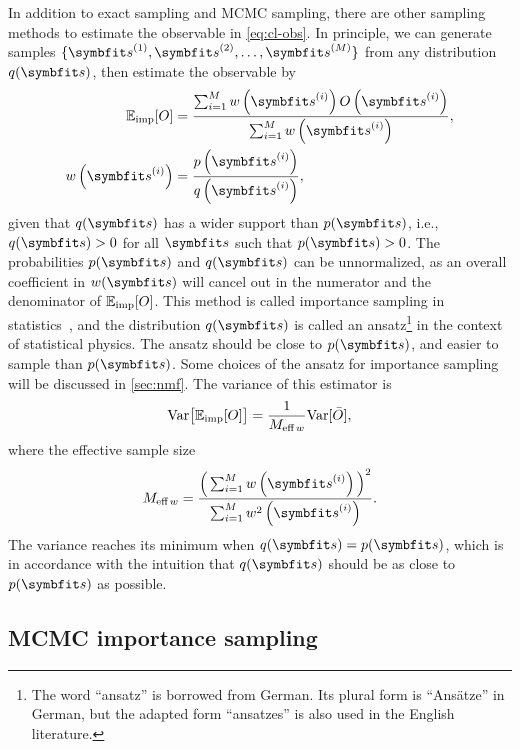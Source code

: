 In addition to exact sampling and MCMC sampling, there are other sampling methods to estimate the observable in \cref{eq:cl-obs}. In principle, we can generate samples $\{\vs^{(1)}, \vs^{(2)}, \ldots, \vs^{(M)}\}$ from any distribution $q(\vs)$, then estimate the observable by
\begin{align}
\bbE_\text{imp}[O] &= \frac{\sum_{i = 1}^M w\left( \vs^{(i)} \right) O\left( \vs^{(i)} \right)}{\sum_{i = 1}^M w\left( \vs^{(i)} \right)}, \label{eq:importance-sampling} \\
w\left( \vs^{(i)} \right) &= \frac{p\left( \vs^{(i)} \right)}{q\left(\vs^{(i)} \right)},
\end{align}
given that $q(\vs)$ has a wider support than $p(\vs)$, i.e., $q(\vs) > 0$ for all $\vs$ such that $p(\vs) > 0$. The probabilities $p(\vs)$ and $q(\vs)$ can be unnormalized, as an overall coefficient in $w(\vs)$ will cancel out in the numerator and the denominator of $\mathbb{E}_\text{imp}[O]$. This method is called importance sampling in statistics~\cite{kloek1978bayesian, bugallo2017adaptive}, and the distribution $q(\vs)$ is called an ansatz\footnote{The word ``ansatz'' is borrowed from German. Its plural form is ``Ansätze'' in German, but the adapted form ``ansatzes'' is also used in the English literature.} in the context of statistical physics. The ansatz should be close to $p(\vs)$, and easier to sample than $p(\vs)$. Some choices of the ansatz for importance sampling will be discussed in \cref{sec:nmf}. The variance of this estimator is
\begin{equation}
\mathrm{Var}\big[ \mathbb{E}_\text{imp}[O] \big] = \frac{1}{M_{\text{eff}\,w}} \mathrm{Var}[\bar{O}],
\label{eq:importance-sampling-var}
\end{equation}
where the effective sample size
\begin{equation}
M_{\text{eff}\,w} = \frac{\Big( \sum_{i = 1}^M w\left( \vs^{(i)} \right) \Big)^2}{\sum_{i = 1}^M w^2\left( \vs^{(i)} \right)}.
\label{eq:eff-sample-size-w}
\end{equation}
The variance reaches its minimum when $q(\vs) = p(\vs)$, which is in accordance with the intuition that $q(\vs)$ should be as close to $p(\vs)$ as possible.

\subsection{MCMC importance sampling}

